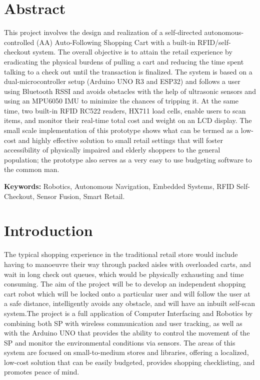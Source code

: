 \documentclass[12pt,a4paper]{article}
\begin{document}
\newpage

\section*{Abstract}
This project involves the design and realization of a self-directed autonomous-controlled (AA) Auto-Following Shopping Cart with a built-in RFID/self-checkout system. The overall objective is to attain the retail experience by eradicating the physical burdens of pulling a cart and reducing the time spent talking to a check out until the transaction is finalized. The system is based on a dual-microcontroller setup (Arduino UNO R3 and ESP32) and follows a user using Bluetooth RSSI and avoids obstacles with the help of ultrasonic sensors and using an MPU6050 IMU to minimize the chances of tripping it. At the same time, two built-in RFID RC522 readers, HX711 load cells, enable users to scan items, and monitor their real-time total cost and weight on an LCD display. The small scale implementation of this prototype shows what can be termed as a low-cost and highly effective solution to small retail settings that will foster accessibility of physically impaired and elderly shoppers to the general population; the prototype also serves as a very easy to use budgeting software to the common man. 

\vspace{0.5cm}

\textbf{Keywords:} Robotics, Autonomous Navigation, Embedded Systems, RFID Self-Checkout, Sensor Fusion, Smart Retail.

\section{Introduction}
The typical shopping experience in the traditional retail store would include having to manoeuvre their way through packed aisles with overloaded carts, and wait in long check out queues, which would be physically exhausting and time consuming. The aim of the project will be to develop an independent shopping cart robot which will be locked onto a particular user and will follow the user at a safe distance, intelligently avoids any obstacle, and will have an inbuilt self-scan system.The project is a full application of Computer Interfacing and Robotics by combining both SP with wireless communication and user tracking, as well as with the Arduino UNO that provides the ability to control the movement of the SP and monitor the environmental conditions via sensors. The areas of this system are focused on small-to-medium stores and libraries, offering a localized, low-cost solution that can be easily budgeted, provides shopping checklisting, and promotes peace of mind. 
\end{document}
